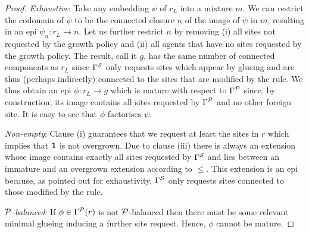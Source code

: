 \begin{proof}
  \emph{Exhaustive}:
  Take any embedding $\psi$ of $r_L$ into a mixture $m$.
  We can restrict the codomain of $\psi$ to be
  the connected closure $n$ of the image of $\psi$ in $m$,
  resulting in an epi $\psi_n: r_L \to n$.
  Let us further restrict $n$ by removing
  (i) all sites not requested by the growth policy and
  (ii) all agents that have no sites requested by the growth policy.
  The result, call it $g$,
  has the same number of connected components as $r_L$
  since $\Gamma^{\mathcal{S}}$ only requests sites
  which appear by glueing
  and are thus (perhaps indirectly) connected to the sites
  that are modified by the rule.
  We thus obtain an epi $\phi: r_L \to g$
  which is mature with respect to $\Gamma^{\mathcal{P}}$ since,
  by construction, its image contains all sites
  requested by $\Gamma^{\mathcal{P}}$ and no other foreign site.
  It is easy to see that $\phi$ factorises $\psi$.

  \emph{Non-empty}:
  Clause (i) guarantees that we request at least the sites in $r$
  which implies that $\boldsymbol{\mathbf{1}}$ is not overgrown.
  Due to clause (iii) there is always an extension
  whose image contains exactly all sites requested by $\Gamma^{\mathcal{S}}$
  and lies between an immature and an overgrown extension
  according to $\leq$.
  This extension is an epi because,
  as pointed out for exhaustivity,
  $\Gamma^{\mathcal{S}}$ only requests sites
  connected to those modified by the rule.

  \emph{$\mathcal{P}$-balanced}:
  If $\phi \in \Gamma^{\mathcal{P}}(r)$ is not $\mathcal{P}$-balanced
  then there must be some relevant minimal glueing
  inducing a further site request.
  Hence, $\phi$ cannot be mature.


\end{proof}
